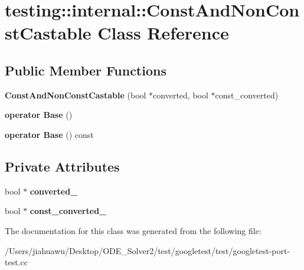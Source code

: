 \hypertarget{classtesting_1_1internal_1_1_const_and_non_const_castable}{}\section{testing\+:\+:internal\+:\+:Const\+And\+Non\+Const\+Castable Class Reference}
\label{classtesting_1_1internal_1_1_const_and_non_const_castable}
\subsection*{Public Member Functions}
\begin{DoxyCompactItemize}
\item 
\mbox{\label{classtesting_1_1internal_1_1_const_and_non_const_castable_aebe0ef6897b7f805e227bb969d4ee034}} 
{\bfseries Const\+And\+Non\+Const\+Castable} (bool $\ast$converted, bool $\ast$const\+\_\+converted)
\item 
\mbox{\label{classtesting_1_1internal_1_1_const_and_non_const_castable_aff0c372d429d76d002bb29f83f2429fa}} 
{\bfseries operator Base} ()
\item 
\mbox{\label{classtesting_1_1internal_1_1_const_and_non_const_castable_a4e8ee8051162f1dfc1da294c71481e2f}} 
{\bfseries operator Base} () const
\end{DoxyCompactItemize}
\subsection*{Private Attributes}
\begin{DoxyCompactItemize}
\item 
\mbox{\label{classtesting_1_1internal_1_1_const_and_non_const_castable_a0c0e17ac5ed0fcccb17d8c40d112ada2}} 
bool $\ast$ {\bfseries converted\+\_\+}
\item 
\mbox{\label{classtesting_1_1internal_1_1_const_and_non_const_castable_a890e63e63b171f3fb9bc32512ab06701}} 
bool $\ast$ {\bfseries const\+\_\+converted\+\_\+}
\end{DoxyCompactItemize}


The documentation for this class was generated from the following file\+:\begin{DoxyCompactItemize}
\item 
/\+Users/jiahuawu/\+Desktop/\+O\+D\+E\+\_\+\+Solver2/test/googletest/test/googletest-\/port-\/test.\+cc\end{DoxyCompactItemize}
